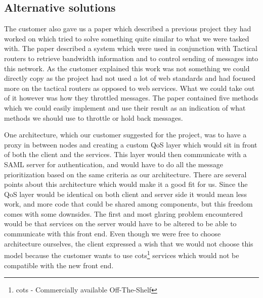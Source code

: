     \subsection{Alternative solutions}\label{Alternative solutions}

        The customer also gave us a paper\cite{soa-qos-pdf} which described a previous project they had worked on which tried to solve something quite similar to what we were tasked with. The paper described a system which were used in conjunction with Tactical routers to retrieve bandwidth information and to control sending of messages into this network. As the customer explained this work was not something we could directly copy as the project had not used a lot of web standards and had focused more on the tactical routers as opposed to web services. What we could take out of it however was how they throttled messages. The paper contained five methods which we could easily implement and use their result as an indication of what methods we should use to throttle or hold back messages.

        One architecture, which our customer suggested for the project, was to have a proxy in between nodes and creating a custom QoS layer which would sit in front of both the client and the services. This layer would then communicate with a SAML server for authentication, and would have to do all the message prioritization based on the same criteria as our architecture. There are several points about this architecture which would make it a good fit for us. Since the QoS layer would be identical on both client and server side it would mean less work, and more code that could be shared among components, but this freedom comes with some downsides. The first and most glaring problem encountered would be that services on the server would have to be altered to be able to communicate with this front end. Even though we were free to choose architecture ourselves, the client expressed a wish that we would not choose this model because the customer wants to use \gls{cots}\footnote{\gls{cots} - Commercially available Off-The-Shelf} services which would not be compatible with the new front end.

